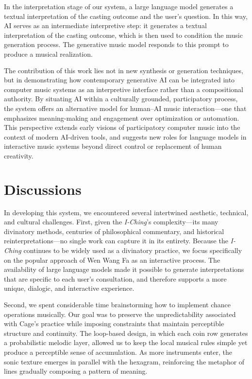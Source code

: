 \documentclass{article}
\begin{document}
In the interpretation stage of our system, a large language model generates a textual interpretation of the casting outcome and the user’s question. In this way, AI serves as an intermediate interpretive step: it generates a textual interpretation of the casting outcome, which is then used to condition the music generation process. The generative music model responds to this prompt to produce a musical realization.

The contribution of this work lies not in new synthesis or generation techniques, but in demonstrating how contemporary generative AI can be integrated into computer music systems as an interpretive interface rather than a compositional authority. By situating AI within a culturally grounded, participatory process, the system offers an alternative model for human–AI music interaction---one that emphasizes meaning-making and engagement over optimization or automation. This perspective extends early visions of participatory computer music into the context of modern AI-driven tools, and suggests new roles for language models in interactive music systems beyond direct control or replacement of human creativity.

\section{Discussions}
In developing this system, we encountered several intertwined aesthetic, technical, and cultural challenges. 
First, given the \textit{I-Ching}'s complexity---its many divinatory methods, centuries of philosophical commentary, and historical reinterpretations---no single work can capture it in its entirety. 
Because the \textit{I-Ching} continues to be widely used as a divinatory practice, we focus specifically on the popular approach of Wen Wang Fa as an interactive process.
The availability of large language models made it possible to generate interpretations that are specific to each user's consultation, and therefore supports a more unique, dialogic, and interactive experience.

Second, we spent considerable time brainstorming how to implement chance operations musically. Our goal was to preserve the unpredictability associated with Cage's practice while imposing constraints that maintain perceptible structure and continuity. The loop-based design, in which each coin row generates a probabilistic melodic layer, allowed us to keep the local musical rules simple yet produce a perceptible sense of accumulation. As more instruments enter, the sonic texture emerges in parallel with the hexagram, reinforcing the metaphor of lines gradually composing a pattern of meaning.
\end{document}
